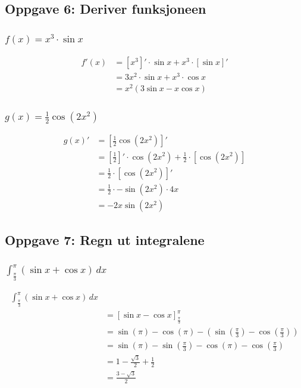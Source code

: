 \documentclass{article}
\begin{document}
\subsection{Oppgave 6: Deriver funksjoneen}

\subsubsection{$f(x)=x^3 \cdot \sin x$}

\begin{align*}
    f'(x) &= [x^3]' \cdot \sin x + x^3 \cdot [\sin x]' \\
    &= 3x^2 \cdot \sin x + x^3 \cdot \cos x \\
    &= x^2(3 \sin x - x \cos x)
\end{align*}

\subsubsection{$g(x)=\frac{1}{2} \cos(2x^2)$}

\begin{align*}
    g(x)'&=[\frac{1}{2} \cos(2x^2)]' \\
    &=[\frac{1}{2}]'\cdot\cos(2x^2) + \frac{1}{2}\cdot[\cos(2x^2)] \\
    &= \frac{1}{2} \cdot [\cos(2x^2)]' \\
    &= \frac{1}{2} \cdot -\sin(2x^2) \cdot 4x \\
    &= -2x\sin(2x^2)
\end{align*}

\subsection{Oppgave 7: Regn ut integralene}

\subsubsection{$\int_{\frac{\pi}{3}}^{\pi}(\sin x + \cos x) \, dx$}

\begin{align*}
    \int_{\frac{\pi}{3}}^{\pi}(\sin x + \cos x) \, dx \\
    &= [\sin x - \cos x]^\pi_\frac{\pi}{3} \\
    &= \sin(\pi) - \cos(\pi) - (\sin(\frac{\pi}{3}) - \cos (\frac{\pi}{3})) \\
    &= \sin(\pi)-\sin(\frac{\pi}{3})-\cos (\pi) - \cos (\frac{\pi}{3}) \\
    &= 1 - \frac{\sqrt{3}}{2} + \frac{1}{2} \\
    &= \frac{3-\sqrt{3}}{2}
\end{align*}
\end{document}
